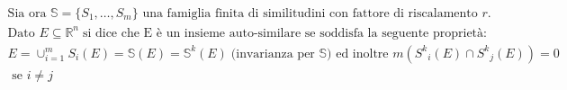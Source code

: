 \documentclass[preview]{standalone}
\begin{document}
\begin{align*}
\text{Sia ora }  \mathbb{S} = \{S_1, \dots, S_m\} \text{ una famiglia finita di similitudini con fattore di riscalamento } r.\\ \text{Dato } E \subseteq \mathbb{R}^n \;\text{si dice che E è un insieme auto-similare se soddisfa la seguente proprietà:} \\  E = \cup_{i=1}^m S_i(E) =  \mathbb{S}(E) = \mathbb{S}^k(E) \; \text{(invarianza per } \mathbb{S}\text{)} \text{ ed inoltre } m({S^k}_i(E) \cap {S^k}_j(E)) = 0 \\ \text{ se } i\not = j \\
\end{align*}
\end{document}
